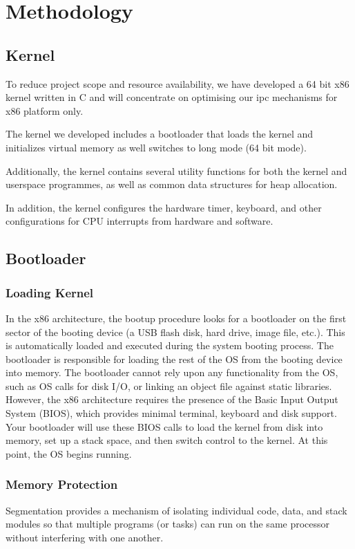 \documentclass[12pt]{report}
\begin{document}
    \chapter{Methodology}

	\section{Kernel}
	To reduce project scope and resource availability, 
	we have developed a 64 bit x86 kernel written in C and will concentrate 
	on optimising our ipc mechanisms for x86 platform only.
	
	The kernel we developed includes a bootloader that loads the kernel and initializes virtual memory
	as well switches to long mode (64 bit mode).
	
	Additionally, the kernel contains several utility functions for both the kernel and userspace programmes, 
	as well as common data structures for heap allocation. 
	
	In addition, the kernel configures the hardware timer, keyboard, and other configurations for CPU interrupts 
	from hardware and software.

    \section{Bootloader}
    \subsection{Loading Kernel}
    In the x86 architecture, the bootup procedure looks for a bootloader on
    the first sector of the booting device (a USB flash disk, hard drive, image
    file, etc.). This is automatically loaded and executed during the system
    booting process. The bootloader is responsible for loading the rest of the
    OS from the booting device into memory. The bootloader cannot rely upon
    any functionality from the OS, such as OS calls for disk I/O, or linking an
    object file against static libraries. However, the x86 architecture requires the
    presence of the Basic Input Output System (BIOS), which provides minimal
    terminal, keyboard and disk support. Your bootloader will use these BIOS
    calls to load the kernel from disk into memory, set up a stack space, and then
    switch control to the kernel. At this point, the OS begins running.

    \subsection{Memory Protection}
    Segmentation provides a mechanism of isolating individual code, data, and   
    stack modules so that multiple programs (or tasks) can run on the same processor 
    without interfering with one another.
\end{document}
